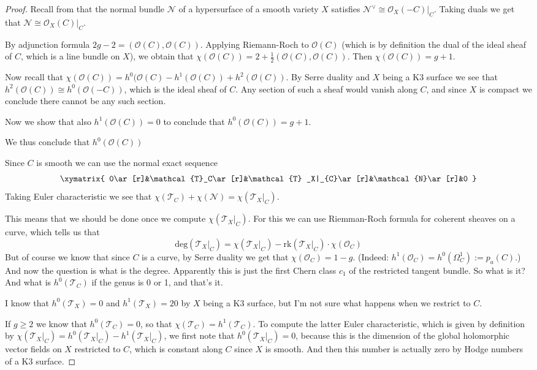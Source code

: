 \documentclass{book}
\begin{document}
\begin{proof}
Recall from \cite[p. 146]{gri} that the
normal bundle
$\mathcal{N}$ of a hypersurface of a smooth
variety $X$ satisfies
$\mathcal{N}^\vee\cong\mathcal{O}_X(-C)|_{C}
$.
Taking duals we get that
$\mathcal{N}\cong\mathcal{O}_X(C)|_{C}$.

By adjunction formula
$2g-2=(\mathcal{O}(C),\mathcal{O}(C))$.
Applying Riemann-Roch
to $\mathcal{O}(C)$ (which is by definition
the dual of the ideal sheaf of $C$,
which is a line bundle on $X$), we obtain
that
$\chi(\mathcal{O}(C))=2+\frac{1}{2}
(\mathcal{O}(C),\mathcal{O}(C))$.
Then
$\chi(\mathcal{O}(C))=g+1$.

Now recall that
$\chi(\mathcal{O}(C))=h^0(\mathcal{O}(C)
-h^1(\mathcal{O}(C))+h^2(\mathcal{O}(C))$. By
Serre duality and $X$ being a K3
surface we see that $h^2(\mathcal{O}(C))\cong
h^{0}(\mathcal{O}(-C))$, which is
the ideal sheaf of $C$. Any section of such a
sheaf would vanish along $C$, and
since $X$ is compact we conclude there cannot
be any such section.

Now we show that also $h^1(\mathcal{O}(C))=0$
to conclude that
$h^0(\mathcal{O}(C))=g+1$.

We thus conclude that $h^0(\mathcal{O}(C))$




Since $C$ is smooth we can use the normal
exact sequence
$$
\xymatrix{
0\ar[r]&\mathcal{T}_C\ar[r]&\mathcal{T}
_X|_{C}\ar[r]&\mathcal{N}\ar[r]&0
}
$$
Taking Euler characteristic we see that
$\chi(\mathcal{T}_C)+\chi(\mathcal{N})=
\chi(\mathcal{T}_X|_{C})$.


This means that we should be done once we
compute $\chi(\mathcal{T}_X|_{C})$.
For this we can use Riemman-Roch formula for
coherent sheaves on a curve, which
tells us that
$$
\text{deg}(\mathcal{T}_X|_{C})=
\chi(\mathcal{T}_X|_{C})
-\text{rk}(\mathcal{T}_X|_{C})
\cdot\chi(\mathcal{O}_C)
$$
But of course we know that since $C$ is a
curve, by Serre duality we get that
$\chi(\mathcal{O}_C)=1-g$. (Indeed:
$h^1(\mathcal{O}_C)=h^0(\Omega^1_C):=p_a(C)
$.)
And now the question is what is
the degree. Apparently this is just the first
Chern class $c_1$ of the
restricted tangent bundle. So what is it? And
what is $h^0(\mathcal{T}_C)$ if
the genus is 0 or 1, and that's it.

I
know that $h^0(\mathcal{T}_X)=0$ and
$h^1(\mathcal{T}_X)=20$ by $X$ being a K3
surface, but I'm not sure what happens when
we restrict to $C$.

If $g \geq 2$ we know that
$h^0(\mathcal{T}_C)=0$, so that
$\boxed{\chi(\mathcal{T}_C)=h^1(\mathcal{T}
_C)}$.
\bigskip
To compute the
latter Euler characteristic, which is given
by definition by
$\chi(\mathcal{T}_X|_{C})=h^0(\mathcal{T}
_X|_{C})-h^1(\mathcal{T}_X|_{C})$,
we
first note that $h^0(\mathcal{T}_X|_{C})=0$,
because this is the dimension of
the global holomorphic vector fields on $X$
restricted to $C$, which is constant along
$C$ since $X$ is
smooth. And then this number is actually zero
by Hodge numbers of a K3 surface.


\end{proof}
\end{document}

